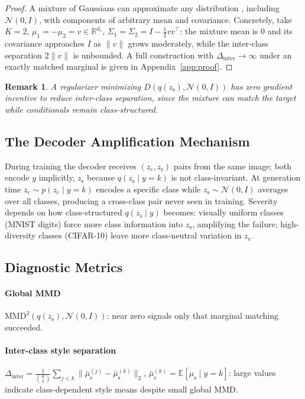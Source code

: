 \documentclass[10pt,letterpaper]{article}
\newcommand{\zc}{z_{\mathrm{c}}}
\newcommand{\zs}{z_{\mathrm{s}}}
\newcommand{\mus}{\mu_{\mathrm{s}}}
\newcommand{\R}{\mathbb{R}}
\newcommand{\MMD}{\mathrm{MMD}}
\newtheorem{remark}{Remark}
\begin{document}
\begin{proof}
A mixture of Gaussians can approximate any distribution
\citep{goodfellow2016deep}, including $\mathcal{N}(0,I)$, with components of
arbitrary mean and covariance. Concretely, take $K=2$,
$\mu_1=-\mu_2=v\in\R^{d_s}$, $\Sigma_1=\Sigma_2=I-\tfrac12 vv^\top$: the
mixture mean is $0$ and its covariance approaches $I$ as $\|v\|$ grows
moderately, while the inter-class separation $2\|v\|$ is unbounded. A full
construction with $\Delta_{\mathrm{inter}}\to\infty$ under an exactly
matched marginal is given in Appendix~\ref{app:proof}.
\end{proof}

\begin{remark}
A regularizer minimizing $D(q(\zs),\mathcal{N}(0,I))$ has zero gradient
incentive to reduce inter-class separation, since the mixture can match the
target while conditionals remain class-structured.
\end{remark}

\subsection{The Decoder Amplification Mechanism}
\label{sec:mechanism}

During training the decoder receives $(\zc,\zs)$ pairs from the same image;
both encode $y$ implicitly, $\zs$ because $q(\zs\mid y{=}k)$ is not
class-invariant. At generation time $\zc\sim p(\zc\mid y{=}k)$ encodes a
specific class while $\zs\sim\mathcal{N}(0,I)$ averages over all classes,
producing a cross-class pair never seen in training. Severity depends on how
class-structured $q(\zs\mid y)$ becomes: visually uniform classes (MNIST
digits) force more class information into $\zs$, amplifying the failure;
high-diversity classes (CIFAR-10) leave more class-neutral variation in
$\zs$.

\subsection{Diagnostic Metrics}
\label{sec:diagnostics}

\paragraph{Global MMD} $\MMD^2(q(\zs),\mathcal{N}(0,I))$: near zero signals
only that marginal matching succeeded.

\paragraph{Inter-class style separation}
$\Delta_{\mathrm{inter}}=\frac{1}{\binom{K}{2}}\sum_{j<k}\|\bar\mus^{(j)}-\bar\mus^{(k)}\|_2$,
$\bar\mus^{(k)}=\mathbb{E}[\mus\mid y{=}k]$: large values indicate
class-dependent style means despite small global MMD.
\end{document}
